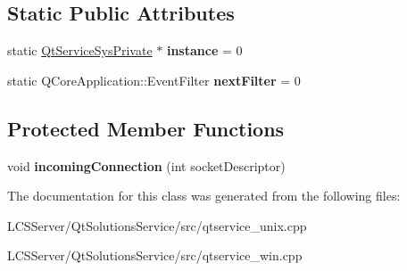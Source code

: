 \subsection*{Static Public Attributes}
\begin{DoxyCompactItemize}
\item 
\mbox{\label{class_qt_service_sys_private_a1c67be022e972d4e1f7d9aad91464222}} 
static \hyperlink{class_qt_service_sys_private}{Qt\+Service\+Sys\+Private} $\ast$ {\bfseries instance} = 0
\item 
\mbox{\label{class_qt_service_sys_private_aeb77807c5daf3c8f1386ffec7a9157c7}} 
static Q\+Core\+Application\+::\+Event\+Filter {\bfseries next\+Filter} = 0
\end{DoxyCompactItemize}
\subsection*{Protected Member Functions}
\begin{DoxyCompactItemize}
\item 
\mbox{\label{class_qt_service_sys_private_aef4490778cdd725fe8a76839e4afe86a}} 
void {\bfseries incoming\+Connection} (int socket\+Descriptor)
\end{DoxyCompactItemize}


The documentation for this class was generated from the following files\+:\begin{DoxyCompactItemize}
\item 
L\+C\+S\+Server/\+Qt\+Solutions\+Service/src/qtservice\+\_\+unix.\+cpp\item 
L\+C\+S\+Server/\+Qt\+Solutions\+Service/src/qtservice\+\_\+win.\+cpp\end{DoxyCompactItemize}
